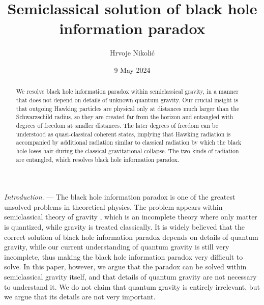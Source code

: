 \documentclass[aps,prd,onecolumn,groupedaddress,showkeys,12pt]{revtex4-2}
\begin{document}
\title{Semiclassical solution of black hole information paradox}

\author{Hrvoje Nikoli\'c}

\date{9 May 2024}

\begin{abstract}
\small
\baselineskip 14pt
We resolve black hole information paradox within semiclassical gravity, in a manner that does not depend on 
details of unknown quantum gravity. Our crucial insight is that outgoing Hawking particles are physical only 
at distances much larger than the Schwarzschild radius, so they are created far from the horizon and entangled 
with degrees of freedom at smaller distances. The later degrees of freedom can be understood as 
quasi-classical coherent states, implying that Hawking radiation is accompanied by additional 
radiation similar to classical radiation by which the black hole loses hair during the classical gravitational 
collapse. The two kinds of radiation are entangled, which resolves black hole information paradox. 
\end{abstract}



\maketitle

{\it Introduction}. --- The black hole information paradox 
\cite{gid,math1,math2,hoss,dundar,harlow,polchinski,chakra,marolf,fabbri}
is one of the greatest unsolved problems in theoretical physics. 
The problem appears within semiclassical theory of gravity 
\cite{bd,mukhanov}, which is an incomplete theory 
where only matter is quantized, while gravity is treated classically.
It is widely believed that the correct solution of black hole information paradox
depends on details of quantum gravity, while our current understanding of 
quantum gravity is still very incomplete, thus making the black hole information paradox 
very difficult to solve. In this paper, however, we argue that the paradox can be solved 
within semiclassical gravity itself, and that details of quantum gravity are not necessary
to understand it. We do not claim that quantum gravity is entirely irrelevant, 
but we argue that its details are not very important.  
\end{document}
